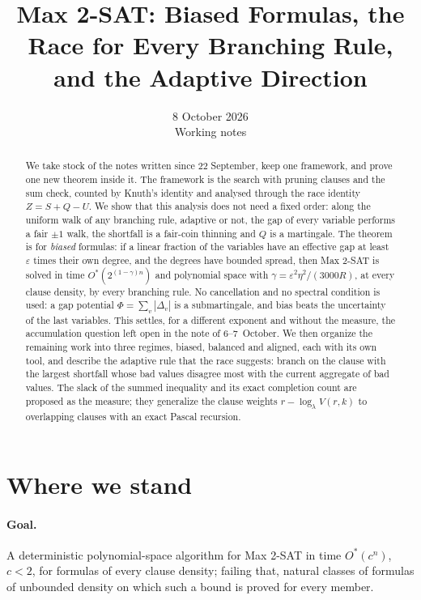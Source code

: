 \documentclass[11pt,a4paper]{article}
\title{Max 2-SAT: Biased Formulas, the Race for Every Branching Rule,\\ and the Adaptive Direction}
\author{}
\date{8 October 2026\\[3pt]\small Working notes}
\theoremstyle{definition}
\theoremstyle{remark}
\newcommand{\Ostar}{O^{*}}
\begin{document}
\maketitle

\begin{abstract}
We take stock of the notes written since 22 September, keep one framework,
and prove one new theorem inside it. The framework is the search with pruning
clauses and the sum check, counted by Knuth's identity and analysed through the
race identity $Z=S+Q-U$. We show that this analysis does not need a fixed
order: along the uniform walk of any branching rule, adaptive or not, the gap
of every variable performs a fair $\pm1$ walk, the shortfall is a fair-coin
thinning and $Q$ is a martingale. The theorem is for \emph{biased} formulas:
if a linear fraction of the variables have an effective gap at least $\varepsilon$
times their own degree, and the degrees have bounded spread, then Max 2-SAT is
solved in time $\Ostar(2^{(1-\gamma)n})$ and polynomial space with
$\gamma=\varepsilon^2\eta^2/(3000R)$, at every clause density, by every
branching rule. No cancellation and no spectral condition is used: a gap
potential $\Phi=\sum_v|\Delta_v|$ is a submartingale, and bias beats the
uncertainty of the last variables. This settles, for a different exponent and
without the measure, the accumulation question left open in the note of
6--7~October. We then organize the remaining work into three regimes, biased,
balanced and aligned, each with its own tool, and describe the adaptive rule
that the race suggests: branch on the clause with the largest shortfall whose
bad values disagree most with the current aggregate of bad values. The slack of
the summed inequality and its exact completion count are proposed as the
measure; they generalize the clause weights $r-\log_\lambda V(r,k)$ to
overlapping clauses with an exact Pascal recursion.
\end{abstract}

\section{Where we stand}\label{sec:state}

\paragraph{Goal.} A deterministic polynomial-space algorithm for Max 2-SAT in
time $\Ostar(c^n)$, $c<2$, for formulas of every clause density; failing that,
natural classes of formulas of unbounded density on which such a bound is
proved for every member.
\end{document}
